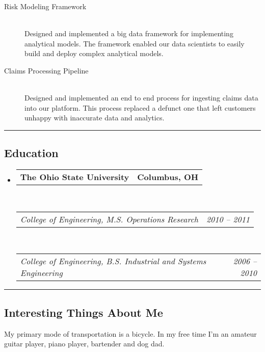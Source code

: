 \documentclass[10pt,letterpaper]{article}
\makeatletter
\newenvironment{indentsection}[1]%
{\begin{list}{}%
	{\setlength{\leftmargin}{#1}}%
	\item[]%
}
{\end{list}}
\newcommand{\headerrow}[2]
{\begin{tabular*}{\linewidth}{l@{\extracolsep{\fill}}r}
	#1 &
	#2 \\
\end{tabular*}}
\makeatother
\begin{document}
\begin{itemize}
\begin{description}
		\item[Risk Modeling Framework] \hfill \\
		Designed and implemented a big data framework for implementing analytical models.  The framework enabled our data scientists to easily build and deploy complex analytical models.
		\item[Claims Processing Pipeline] \hfill \\
		Designed and implemented an end to end process for ingesting claims data into our platform.  This process replaced a defunct one that left customers unhappy with inaccurate data and analytics.
	\end{description}
\end{itemize}
\hrule
\vspace{-0.4em}
\subsection*{Education}
\begin{itemize}
	\parskip=0.1em
	\item 
	\headerrow
		{\textbf{The Ohio State University}}
		{\textbf{Columbus, OH}}
	\\
	\headerrow
		{\emph{College of Engineering, M.S. Operations Research}}
		{\emph{2010 -- 2011}}
	\\
	\headerrow
		{\emph{College of Engineering, B.S. Industrial and Systems Engineering}}
		{\emph{2006 -- 2010}}
\end{itemize}
\hrule
\vspace{-0.4em}
\subsection*{Interesting Things About Me}
\begin{indentsection}{\parindent}
My primary mode of transportation is a bicycle.  In my free time I'm an amateur guitar player, piano player, bartender and dog dad.
\end{indentsection}
\end{document}
